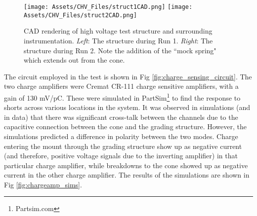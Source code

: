 \begin{figure}
\centering
\texttt{[image: Assets/CHV\_Files/struct1CAD.png]}
\texttt{[image: Assets/CHV\_Files/struct2CAD.png]}
\caption[CAD rendering of high voltage test structure and surrounding instrumentation.]%
{CAD rendering of high voltage test structure and surrounding instrumentation.
\textit{Left}: The structure during Run 1.
\textit{Right}: The structure during Run 2. 
Note the addition of the ``mock spring" which extends out from the cone.
}
\label{fig:struct2CAD}
\end{figure}
The circuit employed in the test is shown in Fig \ref{fig:charge_sensing_circuit}.
The two charge amplifiers were Cremat CR-111 charge sensitive amplifiers, with a gain of 130 mV/pC.
These were simulated in PartSim\footnote{Partsim.com} to find the response to shorts across various locations in the system.
It was observed in simulations (and in data) that there was significant cross-talk between the channels due to the capacitive connection between the cone and the grading structure.
However, the simulations predicted a difference in polarity between the two modes.
Charge entering the mount through the grading structure show up as negative current (and therefore, positive voltage signals due to the inverting amplifier) in that particular charge amplifier, while breakdowns to the cone showed up as negative current in the other charge amplifier.
The results of the simulations are shown in Fig \ref{fig:chargeamp_sims}.

